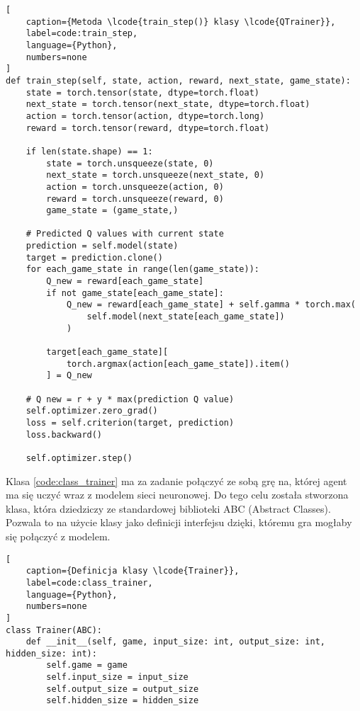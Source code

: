 \begin{onepage}
    \begin{lstlisting}[
    caption={Metoda \lcode{train_step()} klasy \lcode{QTrainer}},
    label=code:train_step,
    language={Python},
    numbers=none
]
def train_step(self, state, action, reward, next_state, game_state):
    state = torch.tensor(state, dtype=torch.float)
    next_state = torch.tensor(next_state, dtype=torch.float)
    action = torch.tensor(action, dtype=torch.long)
    reward = torch.tensor(reward, dtype=torch.float)

    if len(state.shape) == 1:
        state = torch.unsqueeze(state, 0)
        next_state = torch.unsqueeze(next_state, 0)
        action = torch.unsqueeze(action, 0)
        reward = torch.unsqueeze(reward, 0)
        game_state = (game_state,)

    # Predicted Q values with current state
    prediction = self.model(state)
    target = prediction.clone()
    for each_game_state in range(len(game_state)):
        Q_new = reward[each_game_state]
        if not game_state[each_game_state]:
            Q_new = reward[each_game_state] + self.gamma * torch.max(
                self.model(next_state[each_game_state])
            )

        target[each_game_state][
            torch.argmax(action[each_game_state]).item()
        ] = Q_new

    # Q new = r + y * max(prediction Q value)
    self.optimizer.zero_grad()
    loss = self.criterion(target, prediction)
    loss.backward()

    self.optimizer.step()

\end{lstlisting}
\end{onepage}

\clearpage


Klasa  \ref{code:class_trainer} ma za zadanie połączyć ze sobą grę na, której agent ma się uczyć wraz z modelem sieci neuronowej. Do tego celu została stworzona klasa, która dziedziczy ze standardowej biblioteki ABC (Abstract Classes). Pozwala to na użycie klasy  jako definicji interfejsu dzięki, któremu gra mogłaby się połączyć z modelem.

\begin{onepage}
    \begin{lstlisting}[
    caption={Definicja klasy \lcode{Trainer}},
    label=code:class_trainer,
    language={Python},
    numbers=none
]
class Trainer(ABC):
    def __init__(self, game, input_size: int, output_size: int, hidden_size: int):
        self.game = game
        self.input_size = input_size
        self.output_size = output_size
        self.hidden_size = hidden_size
    \end{lstlisting}
\end{onepage}

